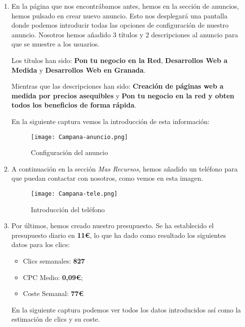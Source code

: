 \begin{enumerate}
    \item En la página que nos encontrábamos antes, hemos en la sección de anuncios, hemos pulsado en crear nuevo anuncio.
          Esto nos desplegará una pantalla donde podemos introducir todas las opciones de configuración de nuestro anuncio.
          Nosotros hemos añadido 3 títulos y 2 descripciones al anuncio para que se muestre a los usuarios.

          Los títulos han sido: \textbf{Pon tu negocio en la Red}, \textbf{Desarrollos Web a Medida} y \textbf{Desarrollos Web en Granada}.

          Mientras que las descripciones han sido: \textbf{Creación de páginas web a medida por precios asequibles} y \textbf{Pon tu negocio en la red y obten todos los beneficios de forma rápida}.

          En la siguiente captura vemos la introducción de esta información:

          \begin{figure}[H]
              \centering
              \texttt{[image: Campana-anuncio.png]}
              \caption{Configuración del anuncio}
          \end{figure}

      \item A continuación en la sección \textit{Mas Recursos}, hemos añadido un teléfono para que puedan contactar con nosotros, como vemos en esta imagen.

      \begin{figure}[H]
          \centering
          \texttt{[image: Campana-tele.png]}
          \caption{Introducción del teléfono}
      \end{figure}

      \item Por últimos, hemos creado nuestro presupuesto. Se ha establecido el presupuesto diario en \textbf{11€}, lo que ha dado como resultado los siguientes datos para los clics:

      \begin{itemize}
          \item Clics semanales: \textbf{827}
          \item CPC Medio: \textbf{0,09€};
          \item Coste Semanal: \textbf{77€}
      \end{itemize}

      En la siguiente captura podemos ver todos los datos introducidos así como la estimación de clics y su coste.


\end{enumerate}

